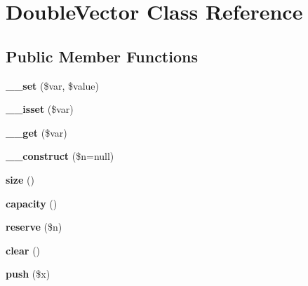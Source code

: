 \hypertarget{class_double_vector}{\section{Double\-Vector Class Reference}
\label{class_double_vector}
}
\subsection*{Public Member Functions}
\begin{DoxyCompactItemize}
\item 
\hypertarget{class_double_vector_a7ee3a43e92f5db122f54e467a7c8df97}{{\bfseries \-\_\-\-\_\-set} (\$var, \$value)}\label{class_double_vector_a7ee3a43e92f5db122f54e467a7c8df97}

\item 
\hypertarget{class_double_vector_a0263a266c23deca047e574de9c517ab8}{{\bfseries \-\_\-\-\_\-isset} (\$var)}\label{class_double_vector_a0263a266c23deca047e574de9c517ab8}

\item 
\hypertarget{class_double_vector_afaa9e9d31d77253005d8c37a0a6ca62e}{{\bfseries \-\_\-\-\_\-get} (\$var)}\label{class_double_vector_afaa9e9d31d77253005d8c37a0a6ca62e}

\item 
\hypertarget{class_double_vector_ae42ec481fa842ecdb8589d21ed1bad75}{{\bfseries \-\_\-\-\_\-construct} (\$n=null)}\label{class_double_vector_ae42ec481fa842ecdb8589d21ed1bad75}

\item 
\hypertarget{class_double_vector_a47cdcd8d4807aca8c45458bad7a1a58e}{{\bfseries size} ()}\label{class_double_vector_a47cdcd8d4807aca8c45458bad7a1a58e}

\item 
\hypertarget{class_double_vector_ad5e765b5ba46a5782398fe6ca3722860}{{\bfseries capacity} ()}\label{class_double_vector_ad5e765b5ba46a5782398fe6ca3722860}

\item 
\hypertarget{class_double_vector_a60431bbce933b2dea43d88e441962946}{{\bfseries reserve} (\$n)}\label{class_double_vector_a60431bbce933b2dea43d88e441962946}

\item 
\hypertarget{class_double_vector_a3298896852dff22bacf0ce55e57cb9ac}{{\bfseries clear} ()}\label{class_double_vector_a3298896852dff22bacf0ce55e57cb9ac}

\item 
\hypertarget{class_double_vector_a49c04d88d3a982c07ef7082d82ef45df}{{\bfseries push} (\$x)}\label{class_double_vector_a49c04d88d3a982c07ef7082d82ef45df}


\end{DoxyCompactItemize}
